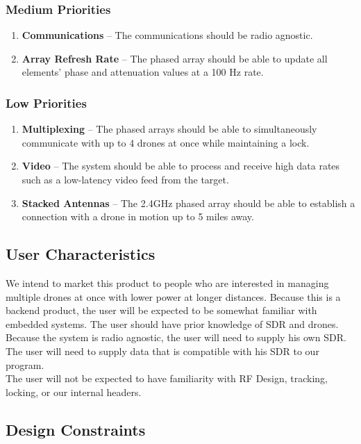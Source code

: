 \documentclass[ProductRequirements.tex]{subfiles}
\begin{document}
		\subsubsection{Medium Priorities}
			\begin{enumerate}
				\item \textbf{Communications} -- The communications should be radio agnostic.
				\item \textbf{Array Refresh Rate} -- The phased array should be able to update all elements' phase and attenuation values at a 100 Hz rate.
			\end{enumerate}
		
		\subsubsection{Low Priorities}
			\begin{enumerate}
				\item \textbf{Multiplexing} -- The phased arrays should be able to simultaneously communicate with up to 4 drones at once while maintaining a lock.
				\item \textbf{Video} -- The system should be able to process and receive high data rates such as a low-latency video feed from the target.
				\item \textbf{Stacked Antennas} -- The 2.4GHz phased array should be able to establish a connection with a drone in motion up to 5 miles away.
			\end{enumerate}
		
	\subsection{User Characteristics}
		We intend to market this product to people who are interested in managing multiple drones at once with lower power at longer distances. Because this is a backend product, the user will be expected to be somewhat familiar with embedded systems. The user should have prior knowledge of SDR and drones. Because the system is radio agnostic, the user will need to supply his own SDR. The user will need to supply data that is compatible with his SDR to our program.\\
		
		The user will not be expected to have familiarity with RF Design, tracking, locking, or our internal headers.
		
	\subsection{Design Constraints}
\end{document}
